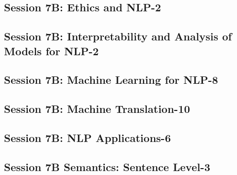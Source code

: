 \subsection{\large Session 7B: Ethics and NLP-2}
\label{parallel-session-7B-trackA}
\TrackALoc\hfill\sessionchair{}{}
\clearpage
\subsection{\large Session 7B: Interpretability and Analysis of Models for NLP-2}
\label{parallel-session-7B-trackB}
\TrackBLoc\hfill\sessionchair{}{}
\clearpage
\subsection{\large Session 7B: Machine Learning for NLP-8}
\label{parallel-session-7B-trackC}
\TrackCLoc\hfill\sessionchair{}{}
\clearpage
\subsection{\large Session 7B: Machine Translation-10}
\label{parallel-session-7B-trackD}
\TrackDLoc\hfill\sessionchair{}{}
\clearpage
\subsection{\large Session 7B: NLP Applications-6}
\label{parallel-session-7B-trackE}
\TrackELoc\hfill\sessionchair{}{}
\clearpage
\subsection{\large Session 7B Semantics: Sentence Level-3}
\label{parallel-session-7B-trackF}
\TrackFLoc\hfill\sessionchair{}{}
\clearpage
